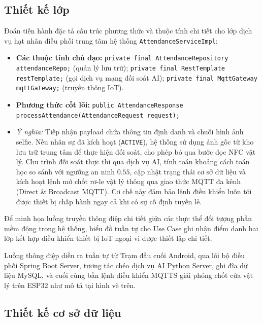 \documentclass[../DoAn.tex]{subfiles}
\begin{document}
\subsection{Thiết kế lớp}

Đoán tiến hành đặc tả cấu trúc phương thức và thuộc tính chi tiết cho lớp dịch vụ hạt nhân điều phối trung tâm hệ thống \texttt{AttendanceServiceImpl}:
\begin{itemize}
    \item \textbf{Các thuộc tính chủ đạo:} 
    \newline \texttt{private final AttendanceRepository attendanceRepo;} (quản lý lưu trữ); 
    \newline \texttt{private final RestTemplate restTemplate;} (gọi dịch vụ mạng đối soát AI); 
    \newline \texttt{private final MqttGateway mqttGateway;} (truyền thông IoT).
    \item \textbf{Phương thức cốt lõi:} 
    \newline \texttt{public AttendanceResponse processAttendance(AttendanceRequest request);}
    \item \textit{Ý nghĩa:} Tiếp nhận payload chứa thông tin định danh và chuỗi hình ảnh selfie. Nếu nhân sự đã kích hoạt (\texttt{ACTIVE}), hệ thống sử dụng ảnh gốc từ kho lưu trữ trung tâm để thực hiện đối soát, cho phép bỏ qua bước đọc NFC vật lý. Chu trình đối soát thực thi qua dịch vụ AI, tính toán khoảng cách toán học so sánh với ngưỡng an ninh $0.55$, cập nhật trạng thái cơ sở dữ liệu và kích hoạt lệnh mở chốt rơ-le vật lý thông qua giao thức MQTT đa kênh (Direct \& Broadcast MQTT). Cơ chế này đảm bảo lệnh điều khiển luôn tới được thiết bị chấp hành ngay cả khi có sự cố định tuyến lẻ.
\end{itemize}

Để minh họa luồng truyền thông điệp chi tiết giữa các thực thể đối tượng phần mềm động trong hệ thống, biểu đồ tuần tự cho Use Case ghi nhận điểm danh hai lớp kết hợp điều khiển thiết bị IoT ngoại vi được thiết lập chi tiết.

Luồng thông điệp diễn ra tuần tự từ Trạm đầu cuối Android, qua lõi bộ điều phối Spring Boot Server, tương tác chéo dịch vụ AI Python Server, ghi đĩa dữ liệu MySQL, và cuối cùng bắn lệnh điều khiển MQTTS giải phóng chốt cửa vật lý trên ESP32 như mô tả tại hình vẽ trên.

\subsection{Thiết kế cơ sở dữ liệu}
\end{document}

